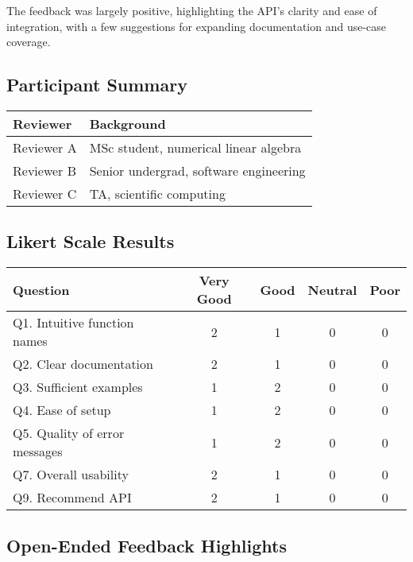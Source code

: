 \documentclass[12pt, titlepage]{article}
\begin{document}
The feedback was largely positive, highlighting the API’s clarity and ease of
integration, with a few suggestions for expanding documentation and use-case
coverage.

\subsection{Participant Summary}

\begin{tabularx}{\linewidth}{lX}
  \toprule
  \textbf{Reviewer} & \textbf{Background}                          \\
  \midrule
  Reviewer A  & MSc student, numerical linear algebra  \\
  Reviewer B  & Senior undergrad, software engineering \\
  Reviewer C  & TA, scientific computing               \\
  \bottomrule
\end{tabularx}

\subsection{Likert Scale Results}

\begin{tabularx}{\linewidth}{lcccc}
  \toprule
  \textbf{Question}                   & \textbf{Very Good} & \textbf{Good} & \textbf{Neutral} & \textbf{Poor} \\
  \midrule
  Q1. Intuitive function names  & 2            & 1       & 0          & 0       \\
  Q2. Clear documentation       & 2            & 1       & 0          & 0       \\
  Q3. Sufficient examples       & 1            & 2       & 0          & 0       \\
  Q4. Ease of setup             & 1            & 2       & 0          & 0       \\
  Q5. Quality of error messages & 1            & 2       & 0          & 0       \\
  Q7. Overall usability         & 2            & 1       & 0          & 0       \\
  Q9. Recommend API             & 2            & 1       & 0          & 0       \\
  \bottomrule
\end{tabularx}

\subsection{Open-Ended Feedback Highlights}
\end{document}
